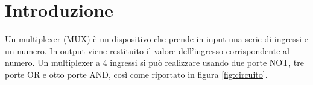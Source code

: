 \section{Introduzione}\label{sec:textscopo}
Un multiplexer (MUX) è un dispositivo che prende in input una serie di ingressi e un numero. In output viene restituito il valore dell'ingresso corrispondente al numero.
Un multiplexer a 4 ingressi si può realizzare usando due porte NOT, tre porte OR e otto porte AND, così come riportato in figura \ref{fig:circuito}.
